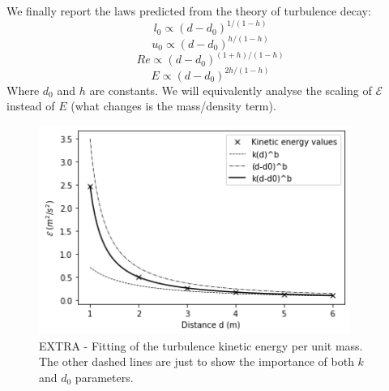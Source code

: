 \documentclass[11pt,titlepage]{article}
\begin{document}
We finally report the laws predicted from the theory of turbulence decay:
\begin{equation} \label{l_0_decay}
	l_0 \propto (d-d_0)^{1/(1-h)}
\end{equation}
\begin{equation}\label{u_0_decay}
	u_0 \propto (d-d_0)^{h/(1-h)}
\end{equation}
\begin{equation}\label{Re_decay}
	Re \propto (d-d_0)^{(1+h)/(1-h)}
\end{equation}
\begin{equation}\label{E_decay}
	E \propto (d-d_0)^{2h/(1-h)}
\end{equation}
Where $d_0$ and $h$ are constants. We will equivalently analyse the scaling of $\mathcal{E}$ instead of $E$ (what changes is the mass/density term).
	\begin{center} 
	\begin{figure} [h]
		\centering
		\includegraphics[width = 4in]{./figures/ex1_5_1.png}
		\caption{EXTRA - Fitting of the turbulence kinetic energy per unit mass. The other dashed lines are just to show the importance of both $k$ and $d_0$ parameters.}
		\label{fig5}
	\end{figure}
\end{center}
\end{document}
